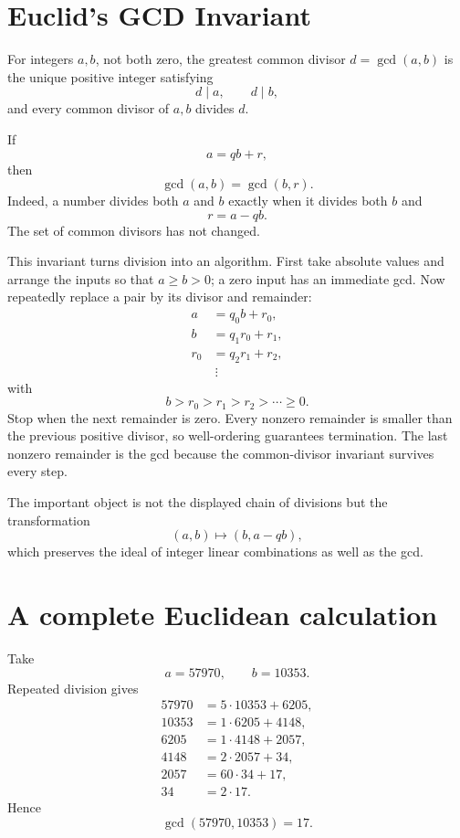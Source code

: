 \section{Euclid's GCD Invariant}

For integers \(a,b\), not both zero, the greatest common divisor \(d=\gcd(a,b)\) is the unique positive integer satisfying
\[
  d\mid a,
  \qquad
  d\mid b,
\]
and every common divisor of \(a,b\) divides \(d\).

If
\[
  a=qb+r,
\]
then
\[
  \gcd(a,b)=\gcd(b,r).
\]
Indeed, a number divides both \(a\) and \(b\) exactly when it divides both \(b\) and
\[
  r=a-qb.
\]
The set of common divisors has not changed.

This invariant turns division into an algorithm. First take absolute values and arrange the inputs so that $a\ge b>0$; a zero input has an immediate gcd. Now repeatedly replace a pair by its divisor and remainder:
\[
\begin{aligned}
  a&=q_0b+r_0,\\
  b&=q_1r_0+r_1,\\
  r_0&=q_2r_1+r_2,\\
  &\ \vdots
\end{aligned}
\]
with
\[
  b>r_0>r_1>r_2>\cdots\ge0.
\]
Stop when the next remainder is zero. Every nonzero remainder is smaller than the previous positive divisor, so well-ordering guarantees termination. The last nonzero remainder is the gcd because the common-divisor invariant survives every step.

The important object is not the displayed chain of divisions but the transformation
\[
  (a,b)\longmapsto(b,a-qb),
\]
which preserves the ideal of integer linear combinations as well as the gcd.

\section{A complete Euclidean calculation}

Take
\[
  a=57970,
  \qquad
  b=10353.
\]
Repeated division gives
\[
\begin{aligned}
  57970&=5\cdot10353+6205,\\
  10353&=1\cdot6205+4148,\\
  6205&=1\cdot4148+2057,\\
  4148&=2\cdot2057+34,\\
  2057&=60\cdot34+17,\\
  34&=2\cdot17.
\end{aligned}
\]
Hence
\[
  \gcd(57970,10353)=17.
\]

